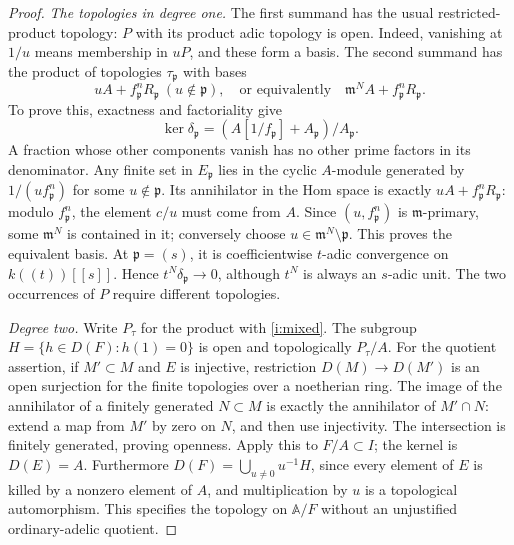\begin{proof}
\emph{The topologies in degree one.}
The first summand has the usual restricted-product topology: $P$ with
its product adic topology is open. Indeed, vanishing at $1/u$ means
membership in $uP$, and these form a basis. The second summand has
the product of topologies $\tau_{\mathfrak p}$ with bases
\begin{equation}\label{i:mixed}
 uA+f_{\mathfrak p}^n R_{\mathfrak p}\ (u\notin\mathfrak p),
 \quad\text{or equivalently}\quad
 \mathfrak m^N A+f_{\mathfrak p}^n R_{\mathfrak p}.
\end{equation}
To prove this, exactness and factoriality give
\[
 \ker\delta_{\mathfrak p}
  =(A[1/f_{\mathfrak p}]+A_{\mathfrak p})/A_{\mathfrak p}.
\]
A fraction whose other components vanish has no other prime factors
in its denominator. Any finite set in $E_{\mathfrak p}$ lies in the
cyclic $A$-module generated by $1/(u f_{\mathfrak p}^n)$ for some
$u\notin\mathfrak p$. Its annihilator in the Hom space is exactly
$uA+f_{\mathfrak p}^nR_{\mathfrak p}$: modulo
$f_{\mathfrak p}^n$, the element $c/u$ must come from $A$.
Since $(u,f_{\mathfrak p}^n)$ is $\mathfrak m$-primary, some
$\mathfrak m^N$ is contained in it; conversely choose
$u\in\mathfrak m^N\setminus\mathfrak p$. This proves the
equivalent basis. At $\mathfrak p=(s)$, it is coefficientwise
$t$-adic convergence on $k((t))[[s]]$. Hence
$t^N\delta_{\mathfrak p}\to0$, although $t^N$ is always an
$s$-adic unit. The two occurrences of $P$ require different topologies.

\emph{Degree two.}
Write $P_\tau$ for the product with \eqref{i:mixed}. The subgroup
$H=\{h\in D(F):h(1)=0\}$ is open and topologically $P_\tau/A$.
For the quotient assertion, if $M'\subset M$ and $E$ is injective,
restriction $D(M)\to D(M')$ is an open surjection for the finite
topologies over a noetherian ring. The image of the annihilator of a
finitely generated $N\subset M$ is exactly the annihilator of
$M'\cap N$: extend a map from $M'$ by zero on $N$, and then use
injectivity. The intersection is finitely generated, proving openness.
Apply this to $F/A\subset I$; the kernel is $D(E)=A$.
Furthermore $D(F)=\bigcup_{u\ne0}u^{-1}H$, since every element of
$E$ is killed by a nonzero element of $A$, and multiplication by $u$
is a topological automorphism. This specifies the topology on
$\mathbb A/F$ without an unjustified ordinary-adelic quotient.


\end{proof}
